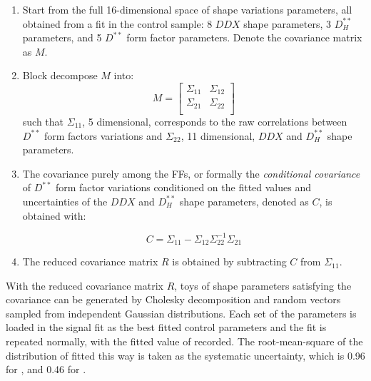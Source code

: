 \begin{enumerate}
    \item Start from the full 16-dimensional space of shape variations
        parameters, all obtained from a fit in the control sample:
        8 $DDX$ shape parameters,
        3 $D^{**}_H$ parameters,
        and 5 $D^{**}$ form factor parameters.
        Denote the covariance matrix as $M$.

    \item Block decompose $M$ into:
        \begin{equation}
            M =
            \begin{bmatrix}
                \Sigma_{11} &  \Sigma_{12} \\
                \Sigma_{21} &  \Sigma_{22} \\
            \end{bmatrix}
        \end{equation}
        such that $\Sigma_{11}$,
        5 dimensional,
        corresponds to the raw correlations between
        $D^{**}$ form factors variations and
        $\Sigma_{22}$, 11 dimensional,
        $DDX$ and $D^{**}_H$ shape parameters.

    \item The covariance purely among the \Dstst FFs,
        or formally the \emph{conditional covariance} of $D^{**}$ form factor
        variations conditioned on the fitted values and uncertainties of
        the $DDX$ and $D^{**}_H$ shape parameters,
        denoted as $C$, is obtained with:

        \begin{equation}
            C = \Sigma_{11} - \Sigma_{12} \Sigma^{-1}_{22} \Sigma_{21}
        \end{equation}

    \item The reduced covariance matrix $R$ is obtained by subtracting $C$ from
        $\Sigma_{11}$.
\end{enumerate}

With the reduced covariance matrix $R$, toys of shape parameters satisfying
the covariance can be generated by Cholesky decomposition and random vectors
sampled from independent Gaussian distributions.
Each set of the parameters is loaded in the signal fit as the best
fitted control parameters and the fit is repeated normally,
with the fitted value of \RDX recorded.
The root-mean-square of the distribution of \RDX fitted this way is taken as
the systematic uncertainty,
which is 0.96 for \RD, and 0.46 for \RDst.

